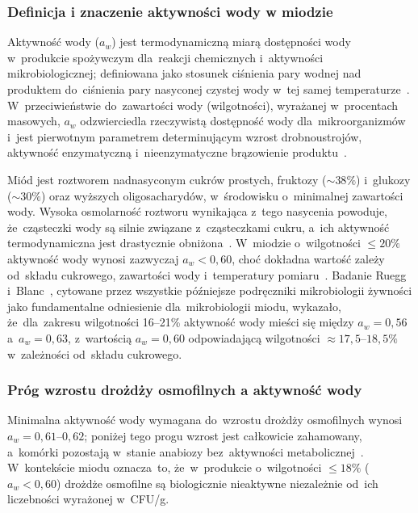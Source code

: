 \subsubsection{Definicja i znaczenie aktywności wody w miodzie}

Aktywność wody ($a_w$) jest termodynamiczną miarą dostępności
wody w~produkcie spożywczym dla~reakcji chemicznych
i~aktywności mikrobiologicznej; definiowana jako stosunek
ciśnienia pary wodnej nad produktem do~ciśnienia pary
nasyconej czystej wody w~tej samej temperaturze~\cite{waaw2006}.
W~przeciwieństwie do~zawartości wody (wilgotności), wyrażanej
w~procentach masowych, $a_w$ odzwierciedla rzeczywistą
dostępność wody dla~mikroorganizmów i~jest pierwotnym
parametrem determinującym wzrost drobnoustrojów, aktywność
enzymatyczną i~nieenzymatyczne brązowienie produktu~\cite{waaw2006}.

Miód jest roztworem nadnasyconym cukrów prostych, fruktozy
($\sim 38\%$) i~glukozy ($\sim 30\%$) oraz wyższych
oligosacharydów, w~środowisku o~minimalnej zawartości wody.
Wysoka osmolarność roztworu wynikająca z~tego nasycenia
powoduje, że~cząsteczki wody są silnie związane z~cząsteczkami
cukru, a~ich aktywność termodynamiczna jest drastycznie
obniżona~\cite{zamora2006,waaw2006}. W~miodzie o~wilgotności
$\leq 20\%$ aktywność wody wynosi zazwyczaj $a_w < 0{,}60$,
choć dokładna wartość zależy od~składu cukrowego, zawartości
wody i~temperatury pomiaru~\cite{ruegg1981,gleiter2006}.
Badanie Ruegg i~Blanc~\cite{ruegg1981}, cytowane przez wszystkie
późniejsze podręczniki mikrobiologii żywności jako fundamentalne
odniesienie dla~mikrobiologii miodu, wykazało, że~dla~zakresu
wilgotności 16--21\% aktywność wody mieści się między
$a_w = 0{,}56$ a~$a_w = 0{,}63$, z~wartością $a_w = 0{,}60$
odpowiadającą wilgotności $\approx 17{,}5$--$18{,}5\%$
w~zależności od~składu cukrowego.

\subsubsection{Próg wzrostu drożdży osmofilnych a aktywność wody}

Minimalna aktywność wody wymagana do~wzrostu drożdży osmofilnych
wynosi $a_w = 0{,}61$--$0{,}62$; poniżej tego progu wzrost jest
całkowicie zahamowany, a~komórki pozostają w~stanie anabiozy
bez~aktywności metabolicznej~\cite{ruegg1981,alwaili2012}.
W~kontekście miodu oznacza~to, że~w~produkcie o~wilgotności
$\leq 18\%$ ($a_w < 0{,}60$) drożdże osmofilne są biologicznie
nieaktywne niezależnie od~ich liczebności wyrażonej w~CFU/g.

